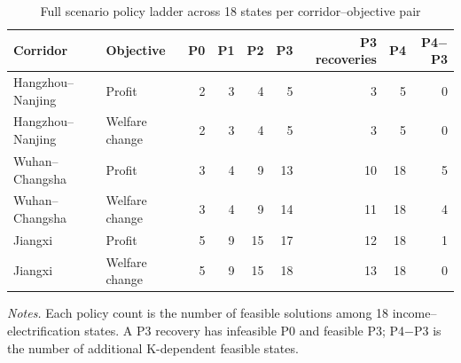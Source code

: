 \begin{table}[htbp]
\centering
\caption{Full scenario policy ladder across 18 states per corridor--objective pair}\label{tab:scenario_policy_recovery}
\begingroup
\small
\setlength{\tabcolsep}{0.55em}
\renewcommand{\arraystretch}{1.08}
\begin{tabular}{@{}llrrrrrrr@{}}
\toprule
Corridor & Objective & P0 & P1 & P2 & P3 & P3 recoveries & P4 & P4$-$P3 \\
\midrule
Hangzhou--Nanjing & Profit & 2 & 3 & 4 & 5 & 3 & 5 & 0 \\
Hangzhou--Nanjing & Welfare change & 2 & 3 & 4 & 5 & 3 & 5 & 0 \\
Wuhan--Changsha & Profit & 3 & 4 & 9 & 13 & 10 & 18 & 5 \\
Wuhan--Changsha & Welfare change & 3 & 4 & 9 & 14 & 11 & 18 & 4 \\
Jiangxi & Profit & 5 & 9 & 15 & 17 & 12 & 18 & 1 \\
Jiangxi & Welfare change & 5 & 9 & 15 & 18 & 13 & 18 & 0 \\
\bottomrule
\end{tabular}
\parbox{0.96\textwidth}{\footnotesize\textit{Notes.} Each policy count is the number of feasible solutions among 18 income--electrification states. A P3 recovery has infeasible P0 and feasible P3; P4$-$P3 is the number of additional K-dependent feasible states.}
\endgroup
\end{table}
